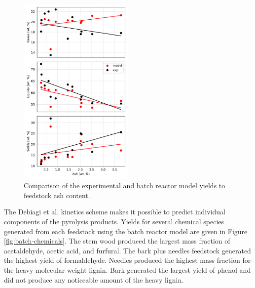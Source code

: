 \begin{figure}[H]
    \centering
    \includegraphics[width=0.5\textwidth]{figures/batch-exp2.pdf}
    \caption{Comparison of the experimental and batch reactor model yields to feedstock ash content.}
    \label{fig:batch-exp2}
\end{figure}

The Debiagi et al. kinetics scheme makes it possible to predict individual components of the pyrolysis products. Yields for several chemical species generated from each feedstock using the batch reactor model are given in Figure \ref{fig:batch-chemicals}. The stem wood produced the largest mass fraction of acetaldehyde, acetic acid, and furfural. The bark plus needles feedstock generated the highest yield of formaldehyde. Needles produced the highest mass fraction for the heavy molecular weight lignin. Bark generated the largest yield of phenol and did not produce any noticeable amount of the heavy lignin.


